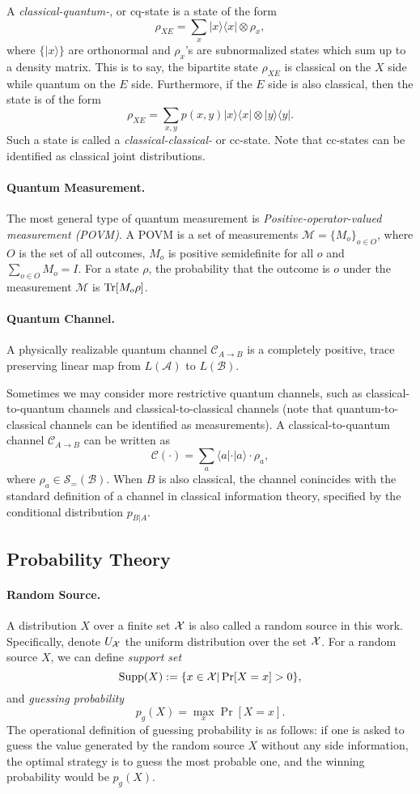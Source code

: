         A \emph{classical-quantum-}, or cq-state is a state of the form
        $$\rho_{XE}=\sum_{x}|x\rangle\langle x|\otimes \rho_x,$$
        where $\{|x\rangle\}$ are orthonormal and $\rho_x$'s are subnormalized states which sum up to a density matrix. This is to say, the bipartite state $\rho_{XE}$ is classical on the $X$ side while quantum on the $E$ side. Furthermore, if the $E$ side is also classical, then the state is of the form
        $$\rho_{XE}=\sum_{x,y}p(x,y)|x\rangle\langle x|\otimes |y\rangle\langle y|.$$
        Such a state is called a \emph{classical-classical-} or cc-state. Note that cc-states can be identified as classical joint distributions.
    \paragraph{Quantum Measurement.}
        The most general type of quantum measurement is \emph{Positive-operator-valued measurement (POVM)}. A POVM is a set of measurements $\mathcal{M}=\{M_o\}_{o\in O}$, where $O$ is the set of all outcomes, $M_o$ is positive semidefinite for all $o$ and $\sum_{o\in O}M_o=I$. For a state $\rho$, the probability that the outcome is $o$ under the measurement $\mathcal{M}$ is $\textnormal{Tr}[M_o\rho]$.
    \paragraph{Quantum Channel.}
        A physically realizable quantum channel $\mathcal{C}_{A\rightarrow B}$ is a completely positive, trace preserving linear map from $L(\mathcal{A})$ to $L(\mathcal{B})$.

        Sometimes we may consider more restrictive quantum channels, such as classical-to-quantum channels and classical-to-classical channels (note that quantum-to-classical channels can be identified as measurements). A classical-to-quantum channel $\mathcal{C}_{A\rightarrow B}$ can be written as
        $$\mathcal{C}(\cdot)=\sum_{a}\langle a| \cdot|a\rangle \cdot\rho_a,$$
        where $\rho_a\in\mathcal{S}_{=}(\mathcal{B})$. When $B$ is also classical, the channel conincides with the standard definition of a channel in classical information theory, specified by the conditional distribution $p_{B|A}$.
\subsection{Probability Theory}
    \paragraph{Random Source.} A distribution $X$ over a finite set $\mathcal{X}$ is also called a random source in this work. Specifically, denote $U_{\mathcal{X}}$ the uniform distribution over the set $\mathcal{X}$. For a random source $X$, we can define \emph{support set} 
        $$\mathrm{Supp}(X):=\{x\in\mathcal{X}|\Pr[X=x]>0\},$$
        and \emph{guessing probability} 
        $$p_g(X)=\max_{x}\Pr[X=x].$$
        The operational definition of guessing probability is as follows: if one is asked to guess the value generated by the random source $X$ without any side information, the optimal strategy is to guess the most probable one, and the winning probability would be $p_g(X)$.
